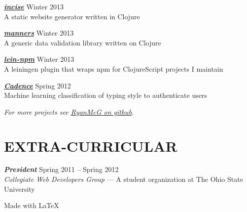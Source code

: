 \documentclass[line,letterpaper]{resume}
\begin{document}
\begin{resume}
    {\sl\textbf{\underline{\href{https://github.com/RyanMcG/incise}{incise}}}}
    \hfill Winter 2013\\
    A static website generator written in Clojure
    \vspace{-6pt}

    {\sl\textbf{\underline{\href{https://github.com/RyanMcG/manners}{manners}}}}
    \hfill Winter 2013\\
    A generic data validation library written on Clojure
    \vspace{-6pt}

    {\sl\textbf{\underline{\href{https://github.com/RyanMcG/lein-npm}{lein-npm}}}}
    \hfill Winter 2013\\
    A leiningen plugin that wraps npm for ClojureScript projects I maintain
    \vspace{-6pt}

    {\sl\textbf{\underline{\href{https://github.com/RyanMcG/Cadence}{Cadence}}}}
    \hfill Spring 2012\\
    Machine learning classification of typing style to authenticate users
    \vspace{-6pt}

    \vspace{-3pt}
    \hfill \emph{For more projects see
    \underline{\href{https://github.com/RyanMcG}{RyanMcG on github}}}.

    \vspace{-15pt}

    \section{\uppercase{Extra-Curricular}}
    {\sl\textbf{President}} \hfill Spring 2011 -- Spring 2012\\
    \emph{Collegiate Web Developers Group} --- A student organization at The
    Ohio State University

\end{resume}

\vspace{20pt}

\hfill Made with \LaTeX{}
\end{document}
